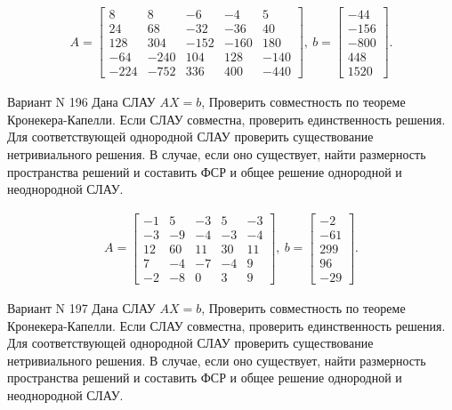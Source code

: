 \documentclass[11pt]{report}
\begin{document}
\begin{align*}
 A = \left[\begin{matrix}8 & 8 & -6 & -4 & 5\\24 & 68 & -32 & -36 & 40\\128 & 304 & -152 & -160 & 180\\-64 & -240 & 104 & 128 & -140\\-224 & -752 & 336 & 400 & -440\end{matrix}\right],
\ b = \left[\begin{matrix}-44\\-156\\-800\\448\\1520\end{matrix}\right]. 
 \end{align*}

Вариант N 196
Дана СЛАУ $AX = b$,
Проверить совместность по теореме Кронекера-Капелли. Если СЛАУ совместна, проверить единственность решения.
Для соответствующей однородной СЛАУ проверить существование нетривиального решения. В случае, если оно существует,
найти размерность пространства решений и составить ФСР и общее решение однородной  и неоднородной СЛАУ.


\begin{align*}
 A = \left[\begin{matrix}-1 & 5 & -3 & 5 & -3\\-3 & -9 & -4 & -3 & -4\\12 & 60 & 11 & 30 & 11\\7 & -4 & -7 & -4 & 9\\-2 & -8 & 0 & 3 & 9\end{matrix}\right],
\ b = \left[\begin{matrix}-2\\-61\\299\\96\\-29\end{matrix}\right]. 
 \end{align*}

Вариант N 197
Дана СЛАУ $AX = b$,
Проверить совместность по теореме Кронекера-Капелли. Если СЛАУ совместна, проверить единственность решения.
Для соответствующей однородной СЛАУ проверить существование нетривиального решения. В случае, если оно существует,
найти размерность пространства решений и составить ФСР и общее решение однородной  и неоднородной СЛАУ.
\end{document}
